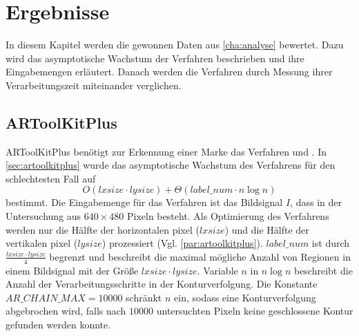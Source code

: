 \chapter{Ergebnisse} %
\label{cha:ergebnisse}
\begin{comment}
	Ergebnisse: Die gewonnen Daten aus Kap. Analyse bewerten.
\end{comment}

In diesem Kapitel werden die gewonnen Daten aus \autoref{cha:analyse} bewertet. Dazu wird das asymptotische Wachstum
 der Verfahren beschrieben und ihre Eingabemengen erläutert. Danach werden die Verfahren durch Messung ihrer
 Verarbeitungszeit miteinander verglichen.

\section{ARToolKitPlus} %
\label{sec:ergebnisse-artoolkitplus}
ARToolKitPlus benötigt zur Erkennung einer Marke das Verfahren  und
 . In \autoref{sec:artoolkitplus} wurde das asymptotische Wachstum des Verfahrens für den
 schlechtesten Fall auf
\begin{equation*}
O(\mathit{lxsize}\cdot\mathit{lysize})  + \Theta(\mathit{label\_num}\cdot n \log n)
\end{equation*}
bestimmt. Die Eingabemenge für das Verfahren ist das Bildsignal $I$, dass in der Untersuchung aus $640 \times 480$
 Pixeln besteht. Als Optimierung des Verfahrens werden nur die Hälfte der horizontalen \gls{pixel} ($\mathit{lxsize}$)
 und die Hälfte der vertikalen \gls{pixel} ($\mathit{lysize}$) prozessiert (Vgl. \autoref{par:artoolkitplus}).
 $\mathit{label\_num}$ ist durch $\tfrac{\mathit{lxsize}\cdot\mathit{lysize}}{4}$ begrenzt und beschreibt die maximal
 mögliche Anzahl von Regionen in einem Bildsignal mit der Größe $\mathit{lxsize}\cdot\mathit{lysize}$. Variable $n$ in
 $n \log n$ beschreibt die Anzahl der Verarbeitungsschritte in der Konturverfolgung. Die Konstante
 $\mathit{AR\_CHAIN\_MAX} = 10000$ schränkt $n$ ein, sodass eine Konturverfolgung abgebrochen wird, falls nach $10000$
 untersuchten Pixeln keine geschlossene Kontur gefunden werden konnte.

